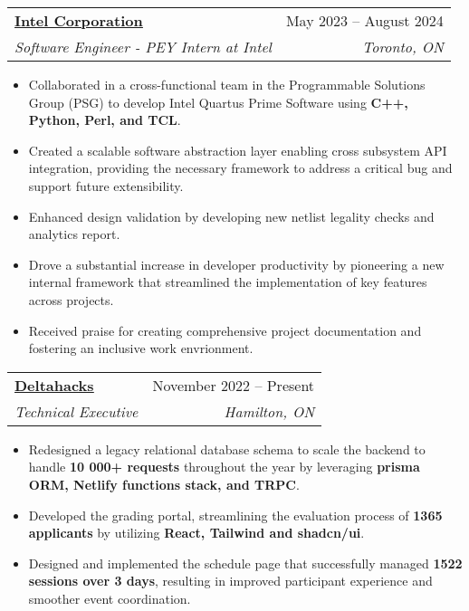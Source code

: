 \documentclass[letterpaper,11pt]{article}
\makeatletter
\newcommand{\resumeItem}[1]{
  \item\small{
    {#1 \vspace{-2pt}}
  }
}
\newcommand{\resumeSubheading}[4]{
  \vspace{-2pt}\item
    \begin{tabular*}{0.97\textwidth}[t]{l@{\extracolsep{\fill}}r}
      \textbf{#1} & #2 \\
      \textit{\small#3} & \textit{\small #4} \\
    \end{tabular*}\vspace{-7pt}
}
\newcommand{\resumeItemListStart}{\begin{itemize}}
\newcommand{\resumeItemListEnd}{\end{itemize}\vspace{-5pt}}
\makeatother
\begin{document}
\resumeSubheading
{\href{https://www.intel.com/content/www/us/en/homepage.html}{\underline{Intel Corporation}}}{May 2023 -- August 2024}
{Software Engineer - PEY Intern at Intel}{Toronto, ON}
\resumeItemListStart
\resumeItem{Collaborated in a cross-functional team in the Programmable Solutions Group (PSG) to develop Intel Quartus Prime Software using \textbf{C++, Python, Perl, and TCL}.}
\resumeItem{Created a scalable software abstraction layer enabling cross subsystem API integration, providing the necessary framework to address a critical bug and support future extensibility.}
\resumeItem{Enhanced design validation by developing new netlist legality checks and analytics report.}
\resumeItem{Drove a substantial increase in developer productivity by pioneering a new internal framework that streamlined the implementation of key features across projects.}
\resumeItem{Received praise for creating comprehensive project documentation and fostering an inclusive work envrionment.}
\resumeItemListEnd

\resumeSubheading
{\href{https://deltahacks.com/}{\underline{Deltahacks}}}{November 2022 -- Present}
{Technical Executive}{Hamilton, ON}
\resumeItemListStart
\resumeItem{Redesigned a legacy relational database schema to scale the backend to handle \textbf{10 000+ requests} throughout the year by leveraging \textbf{prisma ORM, Netlify functions stack, and TRPC}.}
\resumeItem{Developed the grading portal, streamlining the evaluation process of \textbf{1365 applicants} by utilizing \textbf{React, Tailwind and shadcn/ui}.}
\resumeItem{Designed and implemented the schedule page that successfully managed \textbf{1522 sessions over 3 days}, resulting in improved participant experience and smoother event coordination.}
\resumeItemListEnd
\end{document}
